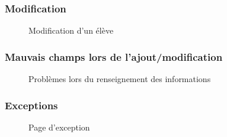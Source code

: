 \documentclass[a4paper,12pt]{article}
\begin{document}
\subsubsection{Modification}
	\begin{figure}[H]
		\center
		\caption{Modification d'un élève}
	\end{figure}

\subsubsection{Mauvais champs lors de l'ajout/modification}
	\begin{figure}[H]
		\center
		\caption{Problèmes lors du renseignement des informations}
\end{figure}
	

\subsubsection{Exceptions}
	\begin{figure}[H]
		\center
		\caption{Page d'exception}
	\end{figure}
	
\end{document}
